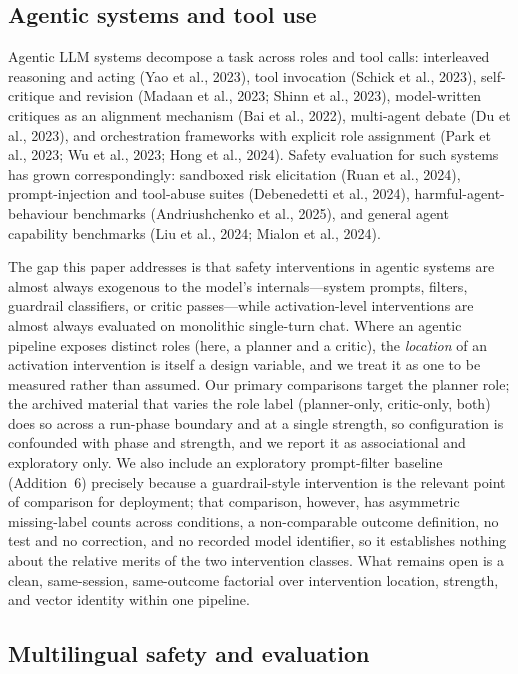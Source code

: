 \subsection{Agentic systems and tool use}

Agentic LLM systems decompose a task across roles and tool calls: interleaved
reasoning and acting (Yao et al., 2023), tool invocation
(Schick et al., 2023), self-critique and revision
(Madaan et al., 2023; Shinn et al., 2023), model-written critiques as an
alignment mechanism (Bai et al., 2022), multi-agent debate
(Du et al., 2023), and orchestration frameworks with explicit role assignment
(Park et al., 2023; Wu et al., 2023; Hong et al., 2024). Safety evaluation for
such systems has grown correspondingly: sandboxed risk elicitation
(Ruan et al., 2024), prompt-injection and tool-abuse suites
(Debenedetti et al., 2024), harmful-agent-behaviour benchmarks
(Andriushchenko et al., 2025), and general agent capability benchmarks
(Liu et al., 2024; Mialon et al., 2024).

The gap this paper addresses is that safety interventions in agentic systems are
almost always exogenous to the model's internals---system prompts, filters,
guardrail classifiers, or critic passes---while activation-level interventions
are almost always evaluated on monolithic single-turn chat. Where an agentic
pipeline exposes distinct roles (here, a planner and a critic), the
\emph{location} of an activation intervention is itself a design variable, and
we treat it as one to be measured rather than assumed. Our primary comparisons
target the planner role; the archived material that varies the role label
(planner-only, critic-only, both) does so across a run-phase boundary and at a
single strength, so configuration is confounded with phase and strength, and we
report it as associational and exploratory only. We also include an exploratory
prompt-filter baseline (Addition~6) precisely because a guardrail-style
intervention is the relevant point of comparison for deployment; that
comparison, however, has asymmetric missing-label counts across conditions, a
non-comparable outcome definition, no test and no correction, and no recorded
model identifier, so it establishes nothing about the relative merits of the two
intervention classes. What remains open is a clean, same-session, same-outcome
factorial over intervention location, strength, and vector identity within one
pipeline.

\subsection{Multilingual safety and evaluation}

